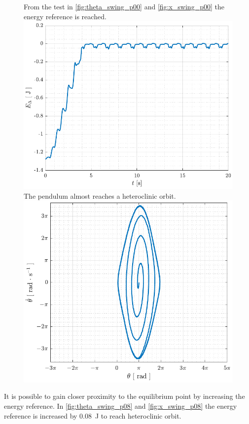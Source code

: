 \begin{figure}[H]
  \hspace{1cm}
  \captionbox
  {
    From the test in \autoref{fig:theta_swing_p00} and \ref{fig:x_swing_p00} the energy reference is reached.
    \label{fig:Edelta_swing_p00}
  }
  {
    \hspace{-1cm}
    \includegraphics[width=.4\textwidth]{figures/Edelta_swing_p00}
  }
  \hspace{20pt}
  \captionbox 
  {
    The pendulum almost reaches a heteroclinic orbit.
    \label{fig:phase_swing_p00}
  }
  {
    \hspace{-1cm}
    \includegraphics[width=.364\textwidth]{figures/phase_swing_p00}
  }  
\end{figure}
%
%
It is possible to gain closer proximity to the equilibrium point by increasing the energy reference. In \autoref{fig:theta_swing_p08} and \ref{fig:x_swing_p08} the energy reference is increased by \SI{0.08}{J} to reach heteroclinic orbit.
%
%
%
